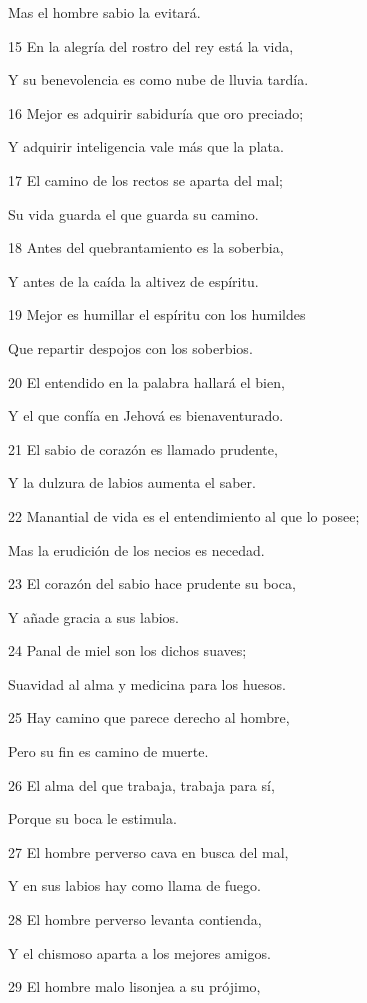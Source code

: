 \par Mas el hombre sabio la evitará.
\par 15 En la alegría del rostro del rey está la vida,
\par Y su benevolencia es como nube de lluvia tardía.
\par 16 Mejor es adquirir sabiduría que oro preciado;
\par Y adquirir inteligencia vale más que la plata. 
\par 17 El camino de los rectos se aparta del mal;
\par Su vida guarda el que guarda su camino.
\par 18 Antes del quebrantamiento es la soberbia,
\par Y antes de la caída la altivez de espíritu.
\par 19 Mejor es humillar el espíritu con los humildes
\par Que repartir despojos con los soberbios.
\par 20 El entendido en la palabra hallará el bien,
\par Y el que confía en Jehová es bienaventurado.
\par 21 El sabio de corazón es llamado prudente,
\par Y la dulzura de labios aumenta el saber.
\par 22 Manantial de vida es el entendimiento al que lo posee;
\par Mas la erudición de los necios es necedad.
\par 23 El corazón del sabio hace prudente su boca,
\par Y añade gracia a sus labios.
\par 24 Panal de miel son los dichos suaves;
\par Suavidad al alma y medicina para los huesos.
\par 25 Hay camino que parece derecho al hombre,
\par Pero su fin es camino de muerte. 
\par 26 El alma del que trabaja, trabaja para sí,
\par Porque su boca le estimula.
\par 27 El hombre perverso cava en busca del mal,
\par Y en sus labios hay como llama de fuego.
\par 28 El hombre perverso levanta contienda,
\par Y el chismoso aparta a los mejores amigos.
\par 29 El hombre malo lisonjea a su prójimo,
